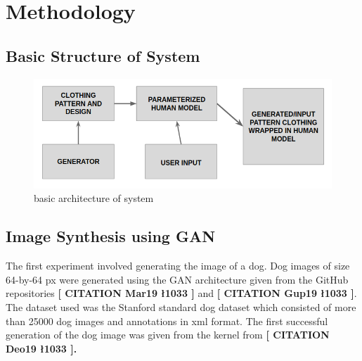 \documentclass{article}
\begin{document}
\newpage
\section{Methodology}

    \subsection{Basic Structure of System}
        \begin{figure}[h]
            \centering
            \includegraphics[scale=0.75]{images/basicArchitecture.png}
            \caption{basic architecture of system}
        \end{figure}
    \blindtext
    
    \subsection{Image Synthesis using GAN}
    
    The first experiment involved generating the image of a dog. Dog images of size 64-by-64 px were generated using the GAN architecture given from the GitHub repositories \textbf{[ CITATION Mar19 \l 1033 ]} and \textbf{[ CITATION Gup19 \l 1033 ]}. The dataset used was the Stanford standard dog dataset which consisted of more than 25000 dog images and annotations in xml format. The first successful generation of the dog image was given from the kernel from \textbf{[ CITATION Deo19 \l 1033 ].}
    
\end{document}
